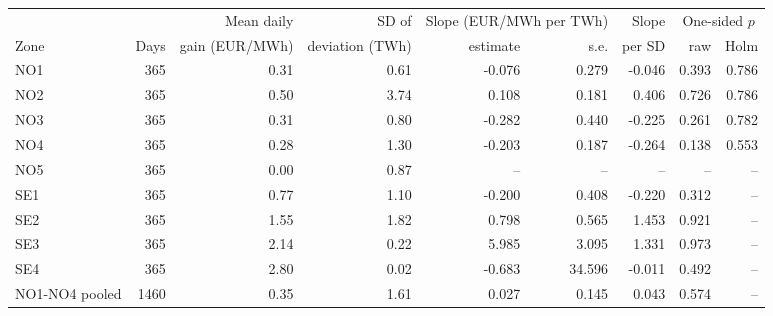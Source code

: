 \begin{tabular}{lrrrrrrrr}
\toprule
 & & Mean daily & SD of & \multicolumn{2}{c}{Slope (EUR/MWh per TWh)} & Slope & \multicolumn{2}{c}{One-sided $p$} \\
\cmidrule(lr){5-6} \cmidrule(lr){8-9}
Zone & Days & gain (EUR/MWh) & deviation (TWh) & estimate & s.e. & per SD & raw & Holm \\
\midrule
NO1 & 365 & 0.31 & 0.61 & -0.076 & 0.279 & -0.046 & 0.393 & 0.786 \\
NO2 & 365 & 0.50 & 3.74 & 0.108 & 0.181 & 0.406 & 0.726 & 0.786 \\
NO3 & 365 & 0.31 & 0.80 & -0.282 & 0.440 & -0.225 & 0.261 & 0.782 \\
NO4 & 365 & 0.28 & 1.30 & -0.203 & 0.187 & -0.264 & 0.138 & 0.553 \\
NO5 & 365 & 0.00 & 0.87 & -- & -- & -- & -- & -- \\
\midrule
SE1 & 365 & 0.77 & 1.10 & -0.200 & 0.408 & -0.220 & 0.312 & -- \\
SE2 & 365 & 1.55 & 1.82 & 0.798 & 0.565 & 1.453 & 0.921 & -- \\
SE3 & 365 & 2.14 & 0.22 & 5.985 & 3.095 & 1.331 & 0.973 & -- \\
SE4 & 365 & 2.80 & 0.02 & -0.683 & 34.596 & -0.011 & 0.492 & -- \\
\midrule
NO1-NO4 pooled & 1460 & 0.35 & 1.61 & 0.027 & 0.145 & 0.043 & 0.574 & -- \\
\bottomrule
\end{tabular}

